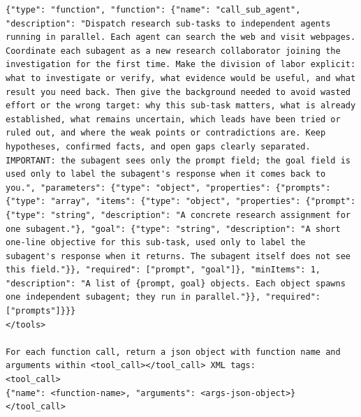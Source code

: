 \documentclass{llmxive}
\begin{document}
\begin{lstlisting}
{"type": "function", "function": {"name": "call_sub_agent", "description": "Dispatch research sub-tasks to independent agents running in parallel. Each agent can search the web and visit webpages. Coordinate each subagent as a new research collaborator joining the investigation for the first time. Make the division of labor explicit: what to investigate or verify, what evidence would be useful, and what result you need back. Then give the background needed to avoid wasted effort or the wrong target: why this sub-task matters, what is already established, what remains uncertain, which leads have been tried or ruled out, and where the weak points or contradictions are. Keep hypotheses, confirmed facts, and open gaps clearly separated. IMPORTANT: the subagent sees only the prompt field; the goal field is used only to label the subagent's response when it comes back to you.", "parameters": {"type": "object", "properties": {"prompts": {"type": "array", "items": {"type": "object", "properties": {"prompt": {"type": "string", "description": "A concrete research assignment for one subagent."}, "goal": {"type": "string", "description": "A short one-line objective for this sub-task, used only to label the subagent's response when it returns. The subagent itself does not see this field."}}, "required": ["prompt", "goal"]}, "minItems": 1, "description": "A list of {prompt, goal} objects. Each object spawns one independent subagent; they run in parallel."}}, "required": ["prompts"]}}}
</tools>

For each function call, return a json object with function name and arguments within <tool_call></tool_call> XML tags:
<tool_call>
{"name": <function-name>, "arguments": <args-json-object>}
</tool_call>
\end{lstlisting}
\end{document}
